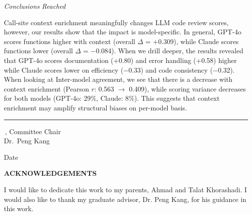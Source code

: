 \documentclass[12pt]{report}
\begin{document}
\vspace{0.3in}

\noindent\textit{Conclusions Reached}

Call-site context enrichment meaningfully changes LLM code review scores, however, our results show that the impact is model-specific. In general, GPT-4o scores functions higher with context (overall $\Delta$ = +0.309), while Claude scores functions lower (overall $\Delta$ = $-$0.084). When we drill deeper, the results revealed that GPT-4o scores documentation (+0.80) and error handling (+0.58) higher while Claude scores lower on efficiency ($-$0.33) and code consistency ($-$0.32). When looking at Inter-model agreement, we see that there is a decrease with context enrichment (Pearson $r$: 0.563 $\to$ 0.409), while scoring variance decreases for both models (GPT-4o: 29\%, Claude: 8\%). This suggests that context enrichment may amplify structural biases on per-model basis.

\vspace{0.7in}

\noindent\rule{2.75in}{0.4pt}\,, Committee Chair \\[4pt]
\noindent Dr.\ Peng Kang

\par\nobreak
\vspace{0.25in}
\noindent Date
\clearpage

\thispagestyle{fancy}
\begin{center}
\textbf{ACKNOWLEDGEMENTS}
\end{center}

\vspace{0.2in}
I would like to dedicate this work to my parents, Ahmad and Talat Khorashadi. I would also like to thank my graduate advisor, Dr. Peng Kang, for his guidance in this work.



\clearpage

\thispagestyle{fancy}
\begin{singlespace}
\tableofcontents
\end{singlespace}
\clearpage
\end{document}
